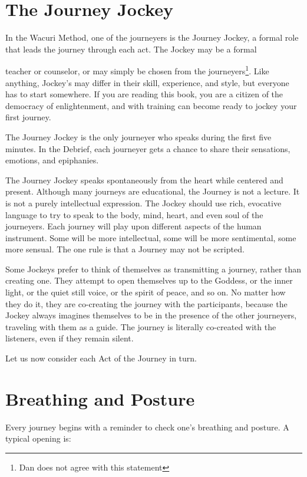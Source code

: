 \documentclass[12pt]{book}
\begin{document}
\section{The Journey Jockey}

In the Wacuri Method, one of the journeyers is the Journey Jockey, a formal role that leads the journey through each act. The Jockey may be a formal
					
teacher or counselor, or may simply be chosen from the journeyers\footnote{Dan does not agree with this statement}. Like anything, Jockey’s may differ in their skill, experience, and style, but everyone has to start somewhere. If you are reading this book, you are a citizen of the democracy of enlightenment, and with training can become  ready to jockey your first journey.
					
The Journey Jockey is the only journeyer who speaks during the first five minutes. In the Debrief, each journeyer gets a chance to share their sensations, emotions, and epiphanies.
					
The Journey Jockey speaks spontaneously from the heart while centered and present. Although many journeys are educational, the Journey is not a lecture. It is not a purely intellectual expression. The Jockey should use rich, evocative language to try to speak to the body, mind, heart, and even soul of the journeyers. Each journey will play upon different aspects of the human instrument. Some will be more intellectual, some will be more sentimental, some more sensual. The one rule is that a Journey may not be scripted.
					
Some Jockeys prefer to think of themselves as transmitting a journey, rather than creating one. They attempt to open themselves up to the Goddess, or the inner light, or the quiet still voice, or the spirit of peace, and so on. No matter how they do it, they are co-creating the journey with the participants, because the Jockey always imagines themselves to be in the presence of the other journeyers, traveling with them as a guide. The journey is literally co-created with the listeners, even if they remain silent.
					
Let us now consider each Act of the Journey in turn.
					
\section{Breathing and Posture}
					
Every journey begins with a reminder to check one’s breathing and posture. A typical opening is:
					
\end{document}
